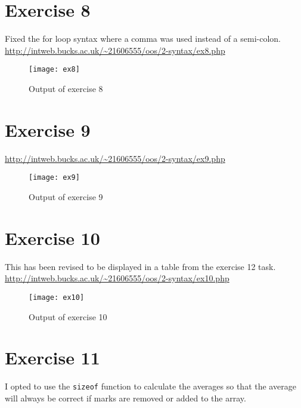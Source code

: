 \clearpage
\section{Exercise 8}

Fixed the for loop syntax where a comma was used instead of a semi-colon.\\

\url{http://intweb.bucks.ac.uk/~21606555/oos/2-syntax/ex8.php}
\captionsetup{type=figure}


\begin{figure}[H]
  \caption{Output of exercise 8}
  \centering
  \texttt{[image: ex8]}
\end{figure}

\clearpage
\section{Exercise 9}

\url{http://intweb.bucks.ac.uk/~21606555/oos/2-syntax/ex9.php}
\captionsetup{type=figure}


\begin{figure}[H]
  \caption{Output of exercise 9}
  \centering
  \texttt{[image: ex9]}
\end{figure}

\clearpage
\section{Exercise 10}

This has been revised to be displayed in a table from the exercise 12 task.\\

\url{http://intweb.bucks.ac.uk/~21606555/oos/2-syntax/ex10.php}
\captionsetup{type=figure}


\begin{figure}[H]
  \caption{Output of exercise 10}
  \centering
  \texttt{[image: ex10]}
\end{figure}

\section{Exercise 11}

I opted to use the \texttt{sizeof} function to calculate the averages so that the average will always be correct if marks are removed or added to the array.\\

